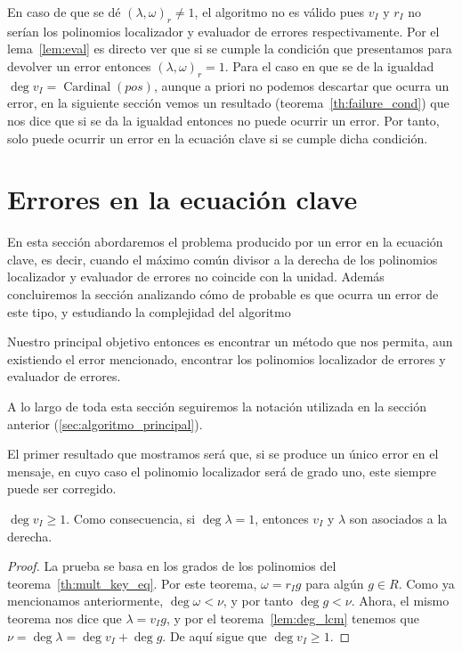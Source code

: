 En caso de que se dé \({(\lambda, \omega)}_r \neq 1\), el algoritmo no es válido pues \(v_I\) y  \(r_I\) no serían los polinomios localizador y evaluador de errores respectivamente. Por el lema~\ref{lem:eval} es directo ver que si se cumple la condición que presentamos para devolver un error entonces \({(\lambda, \omega)}_r = 1\). Para el caso en que se de la igualdad \(\deg v_I = \operatorname{Cardinal}(pos)\), aunque a priori no podemos descartar que ocurra un error, en la siguiente sección vemos un resultado (teorema~\ref{th:failure_cond}) que nos dice que si se da la igualdad entonces no puede ocurrir un error. Por tanto, solo puede ocurrir un error en la ecuación clave si se cumple dicha condición.

\section{Errores en la ecuación clave}%
\label{sec:errores_en_ecuación_clave}

En esta sección abordaremos el problema producido por un error en la ecuación clave, es decir, cuando el máximo común divisor a la derecha de los polinomios localizador y evaluador de errores no coincide con la unidad. Además concluiremos la sección analizando cómo de probable es que ocurra un error de este tipo, y estudiando la complejidad del algoritmo

Nuestro principal objetivo entonces es encontrar un método que nos permita, aun existiendo el error mencionado, encontrar los polinomios localizador de errores y evaluador de errores.

A lo largo de toda esta sección seguiremos la notación utilizada en la sección anterior (\ref{sec:algoritmo_principal}).

El primer resultado que mostramos será que, si se produce un único error en el mensaje, en cuyo caso el polinomio localizador será de grado uno, este siempre puede ser corregido.

\begin{lemma}
    \(\deg v_I \ge 1\). Como consecuencia, si \(\deg \lambda = 1\), entonces  \(v_I\) y  \(\lambda\) son asociados a la derecha.
\end{lemma}

\begin{proof}
    La prueba se basa en los grados de los polinomios del teorema~\ref{th:mult_key_eq}. Por este teorema, \(\omega = r_I g\) para algún \(g \in R\). Como ya mencionamos anteriormente, \(\deg \omega < \nu\), y por tanto \(\deg g < \nu\). Ahora, el mismo teorema nos dice que \(\lambda = v_I g\), y por el teorema~\ref{lem:deg_lcm} tenemos que \(\nu = \deg \lambda = \deg v_{I} + \deg g\). De aquí sigue que \(\deg v_I \ge 1\).
\end{proof}

